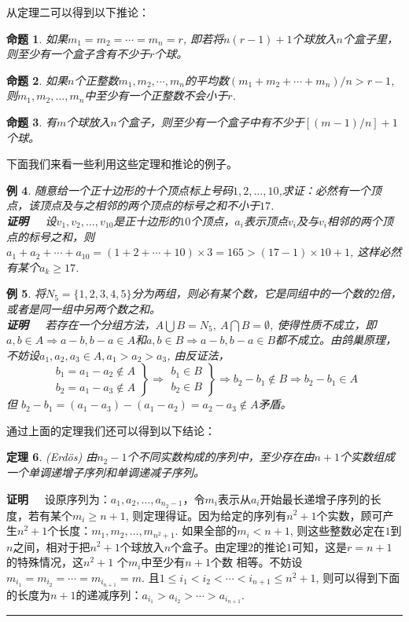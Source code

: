 \documentclass[a4paper,11pt,twoside]{book}
\newtheorem{thm}{定理}[section]
\newtheorem{prop}[thm]{命题}
\newtheorem{exa}[thm]{例}
\def\qed{\nopagebreak\hfill{\rule{4pt}{7pt}}\medbreak}
\def\pf{{\bf 证明~~ }}
\begin{document}
从定理二可以得到以下推论：
\begin{prop}
如果$m_1=m_2=\cdots=m_n=r$,
即若将$n(r-1)+1$个球放入$n$个盒子里，则至少有一个盒子含有不少于$r$个球。
\end{prop}
\begin{prop}
如果$n$个正整数$m_1,m_2,\cdots,m_n$的平均数$(m_1+m_2+\cdots+m_n)/n>r-1$,
则$m_1,m_2,\ldots,m_n$中至少有一个正整数不会小于$r$.
\end{prop}
\begin{prop}
有$m$个球放入$n$个盒子，则至少有一个盒子中有不少于$[(m-1)/n]+1$个球。
\end{prop}

下面我们来看一些利用这些定理和推论的例子。
\begin{exa}
随意给一个正十边形的十个顶点标上号码$1,2,\ldots,10$,求证：必然有一个顶点，该顶点及与之相邻的两个顶点的标号之和不小于$17$.
\\ \pf 设$v_1,v_2,\ldots,v_{10}$是正十边形的$10$个顶点，$a_i$表示顶点$v_i$及与$v_i$相邻的两个顶点的标号之和，则
$a_1+a_2+\cdots+a_{10}=(1+2+\cdots+10)\times 3=165>(17-1)\times
10+1$, 这样必然有某个$a_k\geq 17$.
\end{exa}

\begin{exa}
将$N_5=\{1,2,3,4,5\}$分为两组，则必有某个数，它是同组中的一个数的$2$倍，或者是同一组中另两个数之和。\\
\pf 若存在一个分组方法，$A\bigcup B=N_5,\ A\bigcap B=\emptyset $,
使得性质不成立，即$a,b\in A \Rightarrow a-b,b-a\in A$和$a,b\in B
\Rightarrow a-b,b-a \in
B$都不成立。由鸽巢原理，不妨设$a_1,a_2,a_3\in A, a_1>a_2>a_3$,
由反证法，
$$\left.\begin{array}{c}
  b_1 = a_1-a_2\notin A \\
  b_2 = a_1-a_3\notin A
\end{array}\right\}\Rightarrow\left. \begin{array}{c}
                                  b_1\in B \\
                                    b_2 \in B
                                \end{array}\right\}\Rightarrow
   b_2-b_1 \notin B \Rightarrow b_2-b_1\in A$$
但 $b_2-b_1=(a_1-a_3)-(a_1-a_2)=a_2-a_3\notin A$矛盾。
\end{exa}

通过上面的定理我们还可以得到以下结论：
\begin{thm}{(Erd\"{o}s)}
由$n_2-1$个不同实数构成的序列中，至少存在由$n+1$个实数组成一个单调递增子序列和单调递减子序列。
\end{thm}
\pf
设原序列为：$a_1,a_2,\ldots,a_{n_2-1}$，令$m_i$表示从$a_i$开始最长递增子序列的长度，若有某个$m_i\geq
n+1$,
则定理得证。因为给定的序列有$n^2+1$个实数，顾可产生$n^2+1$个长度：$m_1,m_2,\ldots,m_{n^2+1}$.
如果全部的$m_i<n+1$,
则这些整数必定在$1$到$n$之间，相对于把$n^2+1$个球放入$n$个盒子。由定理$2$的推论$1$可知，这是$r=n+1$的特殊情况，这$n^2+1$
个$m_i$中至少有$n+1$个数
相等。不妨设$m_{i_1}=m_{i_2}=\cdots=m_{i_{n+1}}=m$. 且$1\leq
i_1<i_2<\cdots<i_{n+1}\leq n^2+1$,
则可以得到下面的长度为$n+1$的递减序列：$a_{i_1}>a_{i_2}>\cdots>a_{i_{n+1}}$.
\qed
\end{document}
